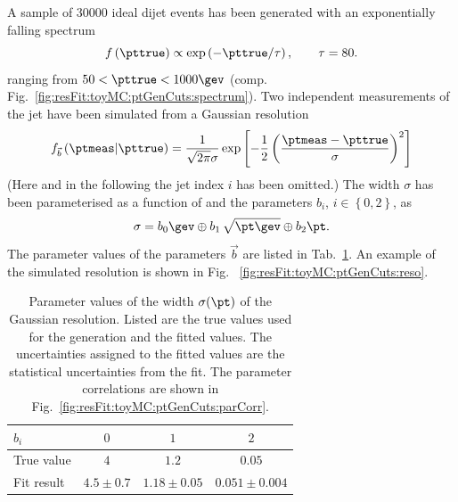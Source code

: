 \documentclass[a4paper]{cmspaper} %
\begin{document}
A sample of 30000 ideal dijet events has been generated with an
exponentially falling spectrum
\begin{equation}
  \label{eq:resFit:toyMCSpec}
  f\left(\pttrue\right) \propto \exp\left(-\pttrue / \tau\right),
  \qquad \tau = 80.
\end{equation}
ranging from \mbox{$50 < \pttrue < 1000\gev$} (comp. Fig.~\ref{fig:resFit:toyMC:ptGenCuts:spectrum}).
Two independent measurements of the jet \pt have been simulated
from a Gaussian resolution
\begin{equation}
  \label{eq:resFit:toyMCRes}
  f_{\vec{b}}\left(\ptmeas|\pttrue\right) = 
  \frac{1}{\sqrt{2\pi}\sigma}\exp\left[-\frac{1}{2}\left(\frac{\ptmeas - \pttrue}{\sigma}\right)^{2}\right]
\end{equation}
(Here and in the following the jet index $i$ has been omitted.)
The width $\sigma$ has been parameterised as a function of \pttrue and
the parameters $b_{i}$, \mbox{$i\in\left\{0,2\right\}$}, as
\begin{equation}
  \label{eq:resFit:toyMCSigma}
  \sigma = b_{0}\gev
  \oplus b_{1}\,\sqrt{\pt\gev}\oplus b_{2}\pt.
\end{equation}
The parameter values of the parameters $\vec{b}$ are listed in
Tab.~\ref{tab:resFit:toyMC:ptGenCuts:fitResult}.
An example of the simulated resolution is shown in Fig. ~\ref{fig:resFit:toyMC:ptGenCuts:reso}.

\begin{table}[ht]
  \centering
  \begin{tabular}[ht]{lccc}
    \hline \hline
    $b_{i}$ & $0$ & $1$ & $2$ \\
    \hline
    True value & $4$           & $1.2$           & $0.05$ \\
    Fit result & $4.5 \pm 0.7$ & $1.18 \pm 0.05$ & $0.051 \pm 0.004$ \\
    \hline \hline
  \end{tabular}
  \caption{Parameter values of the width $\sigma(\pt)$ of the Gaussian
    resolution. Listed are the true values used for the generation and
    the fitted values. The uncertainties assigned to the fitted values
    are the statistical uncertainties from the fit. The parameter
    correlations are shown in Fig.~\ref{fig:resFit:toyMC:ptGenCuts:parCorr}.}
  \label{tab:resFit:toyMC:ptGenCuts:fitResult}
\end{table}
\end{document}
